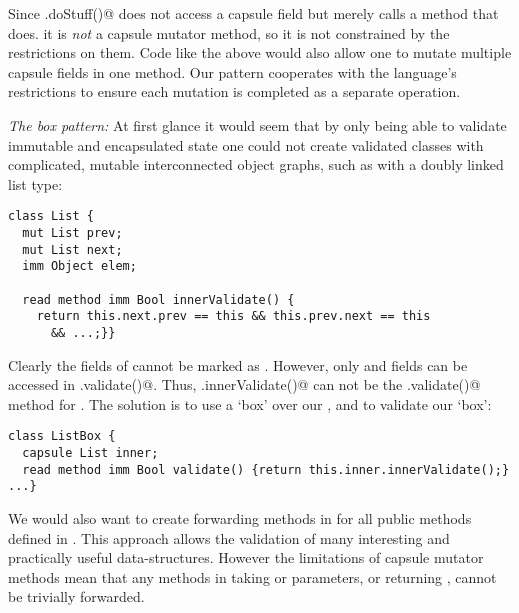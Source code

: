 
Since \Q@.doStuff()@ does not access a capsule field but merely calls a method that does.
it is \emph{not} a capsule mutator method, so it is not constrained by the restrictions on them. Code like the above would also allow one to mutate multiple capsule fields in one method.
Our pattern cooperates with the language’s restrictions to ensure each mutation is completed as a separate operation.%


\loseSpace
\noindent\textit{The box pattern:}
At first glance it would seem that by only being able to validate immutable and encapsulated state one could not create validated classes with complicated, mutable interconnected object graphs, such as with a doubly linked list type:
\begin{lstlisting}[escapechar=\%]
class List {
  mut List prev;
  mut List next;
  imm Object elem;
  
  read method imm Bool innerValidate() {
    return this.next.prev == this && this.prev.next == this
      && ...;}}
\end{lstlisting}
Clearly the \Q@mut@ fields of \Q@List@ cannot be marked as \Q@capsule@.
However, only \Q@capsule@ and \Q@imm@
fields can be accessed in \Q@.validate()@.
Thus, \Q@.innerValidate()@ can not be the \Q@.validate()@ method for \Q@List@.
The solution is to use a `box' over our \Q@List@, and to validate our `box':

\begin{lstlisting}[escapechar=\%]
class ListBox { 
  capsule List inner;
  read method imm Bool validate() {return this.inner.innerValidate();}
...}
\end{lstlisting}
We would also want to create forwarding methods in \Q@ListBox@ for all public methods defined in \Q@List@. This approach allows the validation of many interesting and practically useful data-structures.
However the limitations of capsule mutator methods mean that any \Q@mut@ methods in \Q@ListBox@ taking \Q@read@ or \Q@mut@ parameters, or returning \Q@mut@, cannot be trivially forwarded.

